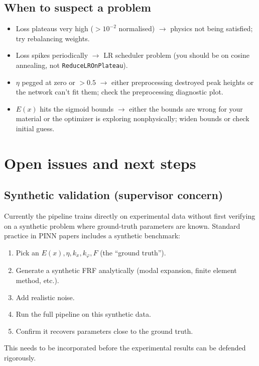 \documentclass[11pt,a4paper]{article}
\begin{document}
\subsection{When to suspect a problem}

\begin{itemize}[leftmargin=*, itemsep=2pt]
\item Loss plateaus very high ($> 10^{-2}$ normalised) $\to$ physics not being satisfied; try rebalancing weights.
\item Loss spikes periodically $\to$ LR scheduler problem (you should be on cosine annealing, not \texttt{ReduceLROnPlateau}).
\item $\eta$ pegged at zero or $> 0.5$ $\to$ either preprocessing destroyed peak heights or the network can't fit them; check the preprocessing diagnostic plot.
\item $E(x)$ hits the sigmoid bounds $\to$ either the bounds are wrong for your material or the optimizer is exploring nonphysically; widen bounds or check initial guess.
\end{itemize}

\section{Open issues and next steps}

\subsection{Synthetic validation (supervisor concern)}

Currently the pipeline trains directly on experimental data without first verifying on a synthetic problem where ground-truth parameters are known. Standard practice in PINN papers includes a synthetic benchmark:
\begin{enumerate}[leftmargin=*, itemsep=2pt]
\item Pick an $E(x), \eta, k_x, k_\varphi, F$ (the ``ground truth'').
\item Generate a synthetic FRF analytically (modal expansion, finite element method, etc.).
\item Add realistic noise.
\item Run the full pipeline on this synthetic data.
\item Confirm it recovers parameters close to the ground truth.
\end{enumerate}
This needs to be incorporated before the experimental results can be defended rigorously.
\end{document}
